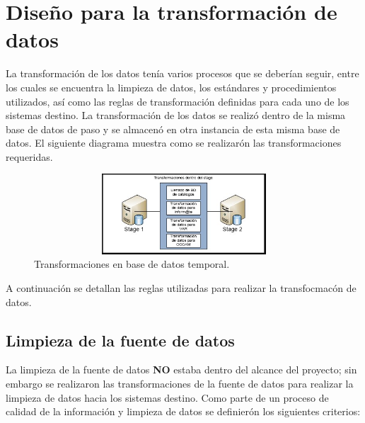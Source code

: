 \section{Diseño para la transformación de datos}

La transformación de los datos tenía varios procesos que se deberían seguir,
entre los cuales se encuentra la limpieza de datos, los estándares y
procedimientos utilizados, así como las reglas de transformación definidas para
cada uno de los sistemas destino. La transformación de los datos se realizó
dentro de la misma base de datos de paso y se almacenó en otra instancia de esta
misma base de datos. El siguiente diagrama muestra como se realizarón las
transformaciones requeridas.

\begin{figure}[htb]
  \begin{center}
    \includegraphics[width=12cm, height=3cm, scale=0.5]{Transformaciones_stage.jpg}
    \caption{Transformaciones en base de datos temporal.}
    \label{fig:transformaciones-en-base-de-datos-temporal}
  \end{center}
\end{figure}

A continuación se detallan las reglas utilizadas para realizar la transfocmacón
de datos.

\subsection{Limpieza de la fuente de datos}

La limpieza de la fuente de datos \textbf{NO} estaba dentro del alcance del
proyecto; sin embargo se realizaron las transformaciones de la fuente de datos
para realizar la limpieza de datos hacia los sistemas destino. Como parte de un
proceso de calidad de la información y limpieza de datos se definierón los
siguientes criterios:

